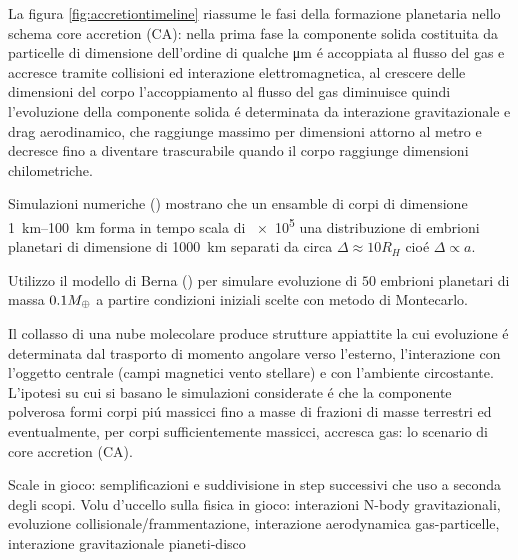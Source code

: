 \documentclass[twoside,11pt,fleqn]{memoir}%
\begin{document}
La figura \ref{fig:accretiontimeline} riassume le fasi della formazione planetaria nello schema core accretion (CA): nella prima fase la componente solida costituita da particelle di dimensione dell'ordine di qualche \si{\micro\meter} \'e accoppiata al flusso del gas e accresce tramite collisioni ed interazione elettromagnetica, al crescere delle dimensioni del corpo l'accoppiamento al flusso del gas diminuisce quindi l'evoluzione della componente solida \'e determinata da interazione gravitazionale e drag aerodinamico, che raggiunge massimo per dimensioni attorno al metro e decresce fino a diventare trascurabile quando il corpo raggiunge dimensioni chilometriche.
\begin{workout}

 Simulazioni numeriche (\cite{kokubo2012dynamics}) mostrano che un ensamble di corpi di dimensione \SIrange{1}{100}{\kilo\meter} forma in tempo scala di \SI{e5}{\year} una distribuzione di embrioni planetari di dimensione di \SI{1000}{\kilo\meter} separati da circa $\Delta\approx10R_H$ cio\'e $\Delta\propto a$.
\end{workout}
\begin{workout}
Utilizzo il modello di Berna (\cite{bibid}) per simulare evoluzione di $50$ embrioni planetari di massa $0.1M_{\oplus}{}$ a partire condizioni iniziali scelte con metodo di Montecarlo.
\end{workout}

\begin{errata}
Il collasso di una nube molecolare produce strutture appiattite la cui evoluzione \'e determinata dal trasporto di momento angolare verso l'esterno, l'interazione con l'oggetto centrale (campi magnetici vento stellare) e con l'ambiente circostante.
L'ipotesi su cui si basano le simulazioni considerate \'e che la componente polverosa formi corpi pi\'u massicci fino a masse di frazioni di masse terrestri  ed eventualmente, per corpi sufficientemente massicci, accresca gas: lo scenario di core accretion (CA).
\end{errata}

\begin{workout}
Scale in gioco: semplificazioni e suddivisione in step successivi che uso a seconda degli scopi.
Volu d'uccello sulla fisica in gioco: interazioni N-body gravitazionali, evoluzione collisionale/frammentazione, interazione aerodynamica gas-particelle, interazione gravitazionale pianeti-disco
\end{workout}
\end{document}
